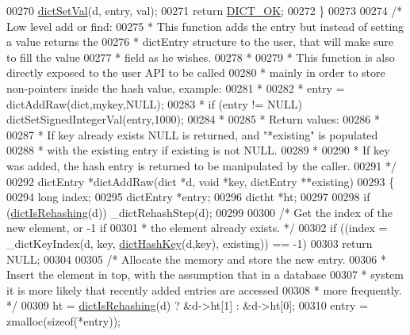 \begin{DoxyCode}
00270     \hyperlink{dict_8h_a95cae6581aca3a7a4c5e226e565294c9}{dictSetVal}(d, entry, val);
00271     \textcolor{keywordflow}{return} \hyperlink{dict_8h_a2afecbeab8f7efbc183048f52f6d17e5}{DICT\_OK};
00272 \}
00273 
00274 \textcolor{comment}{/* Low level add or find:}
00275 \textcolor{comment}{ * This function adds the entry but instead of setting a value returns the}
00276 \textcolor{comment}{ * dictEntry structure to the user, that will make sure to fill the value}
00277 \textcolor{comment}{ * field as he wishes.}
00278 \textcolor{comment}{ *}
00279 \textcolor{comment}{ * This function is also directly exposed to the user API to be called}
00280 \textcolor{comment}{ * mainly in order to store non-pointers inside the hash value, example:}
00281 \textcolor{comment}{ *}
00282 \textcolor{comment}{ * entry = dictAddRaw(dict,mykey,NULL);}
00283 \textcolor{comment}{ * if (entry != NULL) dictSetSignedIntegerVal(entry,1000);}
00284 \textcolor{comment}{ *}
00285 \textcolor{comment}{ * Return values:}
00286 \textcolor{comment}{ *}
00287 \textcolor{comment}{ * If key already exists NULL is returned, and "*existing" is populated}
00288 \textcolor{comment}{ * with the existing entry if existing is not NULL.}
00289 \textcolor{comment}{ *}
00290 \textcolor{comment}{ * If key was added, the hash entry is returned to be manipulated by the caller.}
00291 \textcolor{comment}{ */}
00292 dictEntry *dictAddRaw(dict *d, \textcolor{keywordtype}{void} *key, dictEntry **existing)
00293 \{
00294     \textcolor{keywordtype}{long} index;
00295     dictEntry *entry;
00296     dictht *ht;
00297 
00298     \textcolor{keywordflow}{if} (\hyperlink{dict_8h_aa6e4917a6a32fdf47180e03ed8969e02}{dictIsRehashing}(d)) \_dictRehashStep(d);
00299 
00300     \textcolor{comment}{/* Get the index of the new element, or -1 if}
00301 \textcolor{comment}{     * the element already exists. */}
00302     \textcolor{keywordflow}{if} ((index = \_dictKeyIndex(d, key, \hyperlink{dict_8h_a15a270e95a4eea30557df137e9747a95}{dictHashKey}(d,key), existing)) == -1)
00303         \textcolor{keywordflow}{return} NULL;
00304 
00305     \textcolor{comment}{/* Allocate the memory and store the new entry.}
00306 \textcolor{comment}{     * Insert the element in top, with the assumption that in a database}
00307 \textcolor{comment}{     * system it is more likely that recently added entries are accessed}
00308 \textcolor{comment}{     * more frequently. */}
00309     ht = \hyperlink{dict_8h_aa6e4917a6a32fdf47180e03ed8969e02}{dictIsRehashing}(d) ? &d->ht[1] : &d->ht[0];
00310     entry = zmalloc(\textcolor{keyword}{sizeof}(*entry));

\end{DoxyCode}
